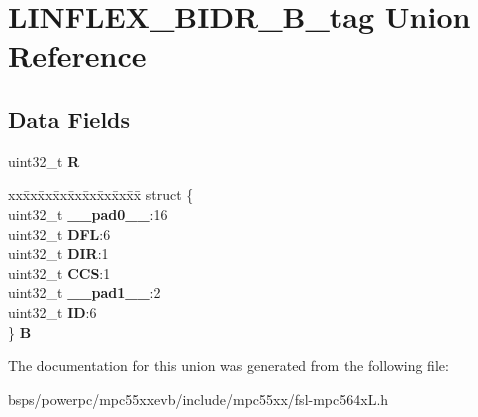 \hypertarget{unionLINFLEX__BIDR__32B__tag}{}\section{L\+I\+N\+F\+L\+E\+X\+\_\+\+B\+I\+D\+R\+\_\+B\+\_\+tag Union Reference}
\label{unionLINFLEX__BIDR__32B__tag}
\subsection*{Data Fields}
\begin{DoxyCompactItemize}
\item 
\mbox{\label{unionLINFLEX__BIDR__32B__tag_acfd8825efea965efe27b30735fbb290d}} 
uint32\+\_\+t {\bfseries R}
\item 
\mbox{\label{unionLINFLEX__BIDR__32B__tag_a7ab1e8c1df572b770d7d0e2b99826b0f}} 
\begin{tabbing}
xx\=xx\=xx\=xx\=xx\=xx\=xx\=xx\=xx\=\kill
struct \{\\
\>uint32\_t {\bfseries \_\_pad0\_\_}:16\\
\>uint32\_t {\bfseries DFL}:6\\
\>uint32\_t {\bfseries DIR}:1\\
\>uint32\_t {\bfseries CCS}:1\\
\>uint32\_t {\bfseries \_\_pad1\_\_}:2\\
\>uint32\_t {\bfseries ID}:6\\
\} {\bfseries B}\\

\end{tabbing}\end{DoxyCompactItemize}


The documentation for this union was generated from the following file\+:\begin{DoxyCompactItemize}
\item 
bsps/powerpc/mpc55xxevb/include/mpc55xx/fsl-\/mpc564x\+L.\+h\end{DoxyCompactItemize}
